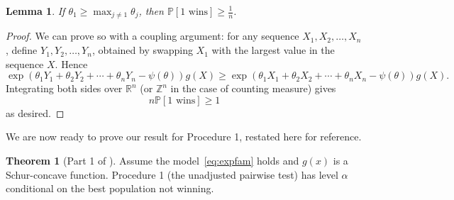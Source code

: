 \documentclass[11pt]{article}
\newtheorem{lemma}[corollary]{Lemma}
\theoremstyle{definition}
\theoremstyle{custom}
\newtheorem*{customthm}{Theorem}
\newcommand{\PP}{\mathbb{P}}
\begin{document}
\begin{lemma}
If $\theta_1 \ge \max_{j \ne 1} \theta_j$, then $\PP\left[1 \text{ wins}\right] \ge \frac{1}{n}$.
\label{lma:margsharp}
\end{lemma}

\begin{proof}
We can prove so with a coupling argument: for any sequence $X_1, X_2, \ldots, X_n$, define $Y_1, Y_2, \ldots, Y_n$, obtained by swapping $X_1$ with the largest value in the sequence $X$. Hence
$$\exp\left(\theta_1 Y_1 + \theta_2 Y_2 + \cdots + \theta_n Y_n - \psi\left(\theta\right)\right) g\left(X\right) \ge \exp\left(\theta_1 X_1 + \theta_2 X_2 + \cdots + \theta_n X_n - \psi\left(\theta\right)\right) g\left(X\right).$$
Integrating both sides over $\mathbb{R}^n$ (or $\mathbb{Z}^n$ in the case of counting measure) gives
$$n \PP\left[1 \text{ wins}\right] \ge 1$$
as desired.
\end{proof}

We are now ready to prove our result for Procedure 1, restated here for reference.

\begin{customthm}[Part 1 of ]
Assume the model~\eqref{eq:expfam} holds and $g\left(x\right)$ is a Schur-concave function. Procedure 1 (the unadjusted pairwise test) has level $\alpha$ conditional on the best population not winning.
\end{customthm}
\end{document}
